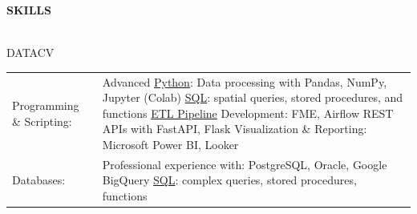 \documentclass[letterpaper]{article}
\newcommand{\lineunder} {
        \vspace*{-8pt} \\
        \hspace*{-18pt} \hrulefill \\
    }
\newcommand{\header} [1] {
        \vspace{9pt}
        {\hspace*{-18pt}\vspace*{6pt} \large \textbf {#1}}
        \vspace*{-6pt} \lineunder
        \vspace{2pt}
    }
\newenvironment{skillslist}
        {
            \hspace*{-0.07in}\begin{tabular}[t]{ l L{5.17in} }
        }{
            \end{tabular}
        }
\newcommand{\impt}[1]{\uline{#1}}
\begin{document}
\header{SKILLS}
    \begin{taggedblock}{DATACV}
        \begin{skillslist}
            Programming \& Scripting:&
                Advanced \impt{Python}: Data processing with Pandas, NumPy, Jupyter (Colab) \linebreak
                \impt{SQL}: spatial queries, stored procedures, and functions \linebreak
                \impt{ETL Pipeline} Development: FME, Airflow \linebreak
                REST APIs with FastAPI, Flask \linebreak
                Visualization \& Reporting: Microsoft Power BI, Looker \linebreak
                \\
            Databases:&
                Professional experience with: PostgreSQL, Oracle, Google BigQuery \linebreak
                \impt{SQL}: complex queries, stored procedures, functions \linebreak
                \\

\end{skillslist}
\end{taggedblock}
\end{document}
